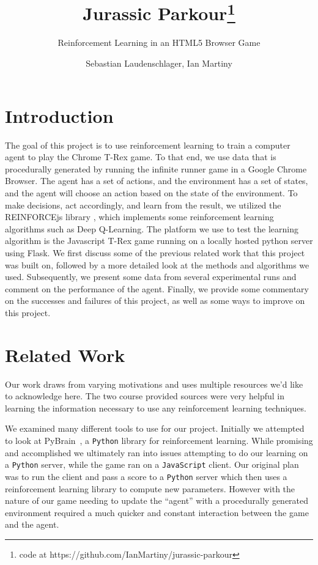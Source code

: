 \documentclass{scrartcl}
\title{Jurassic Parkour\footnote{code at 
https://github.com/IanMartiny/jurassic-parkour}}
\subtitle{Reinforcement Learning in an HTML5 Browser Game}
\author{Sebastian Laudenschlager, Ian Martiny}
\date{}
\begin{document}
\maketitle

\section{Introduction}

The goal of this project is to use reinforcement learning to train a computer
agent to play the Chrome T-Rex game. To that end, we use data that is
procedurally generated by running the infinite runner game in a Google Chrome
Browser. The agent has a set of actions, and the environment has a set of
states, and the agent will choose an action based on the state of the
environment. To make decisions, act accordingly, and learn from the result, we
utilized the REINFORCEjs library \cite{reinforcejs}, which implements some
reinforcement learning algorithms such as Deep Q-Learning. The platform we use
to test the learning algorithm is the Javascript T-Rex game running on a
locally hosted python server using Flask. We first discuss some of the previous
related work that this project was built on, followed by a more detailed look 
at the methods and algorithms we used. Subsequently, we present some data from
several experimental runs and comment on the performance of the agent. Finally,
we provide some commentary on the successes and failures of this project, as
well as some ways to improve on this project.

\section{Related Work}
Our work draws from varying motivations and uses multiple resources we'd like 
to acknowledge here. The two course provided sources \cite{rltutorial, rlblog}
were very helpful in learning the information necessary to use any 
reinforcement learning techniques.

We examined many different tools to use for our project. Initially we attempted
to look at PyBrain~\cite{pybrain}, a \texttt{Python} library for reinforcement
learning. While promising and accomplished we ultimately ran into issues
attempting to do our learning on a \texttt{Python} server, while the game ran on
a \texttt{JavaScript} client. Our original plan was to run the client and pass
a score to a \texttt{Python} server which then uses a reinforcement learning
library to compute new parameters. However with the nature of our game needing
to update the ``agent'' with a procedurally generated environment required a
much quicker and constant interaction between the game and the agent.
\end{document}
